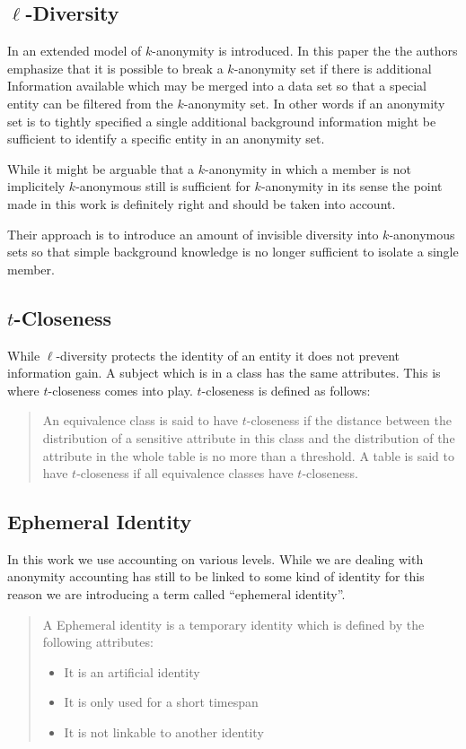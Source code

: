 \subsection{$\ell$-Diversity}
In \cite{machanavajjhala2007diversity} an extended model of $k$-anonymity is introduced. In this paper the the authors emphasize that it is possible to break a $k$-anonymity set if there is additional Information available which may be merged into a data set so that a special entity can be filtered from the $k$-anonymity set. In other words if an anonymity set is to tightly specified a single additional background information might be sufficient to identify a specific entity in an anonymity set.

While it might be arguable that a $k$-anonymity in which a member is not implicitely $k$-anonymous still is sufficient for $k$-anonymity in its sense the point made in this work is definitely right and should be taken into account.

Their approach is to introduce an amount of invisible diversity into $k$-anonymous sets so that simple background knowledge is no longer sufficient to isolate a single member.

\subsection{$t$-Closeness}
While $\ell$-diversity protects the identity of an entity it does not prevent information gain. A subject which is in a class has the same attributes. This is where $t$-closeness\cite{li2007t} comes into play. $t$-closeness is defined as follows:

\begin{quote}
	An equivalence class is said to have $t$-closeness if the distance between the distribution of a sensitive attribute in this class and the distribution of the attribute in the whole table is no more than a threshold. A table is said to have $t$-closeness if all equivalence classes have $t$-closeness.
\end{quote}

\subsection{Ephemeral Identity}
In this work we use accounting on various levels. While we are dealing with anonymity accounting has still to be linked to some kind of identity for this reason we are introducing a term called ``ephemeral identity''.

\begin{quote}
	A Ephemeral identity is a temporary identity which is defined by the following attributes:
	\begin{itemize}
		\item It is an artificial identity
		\item It is only used for a short timespan
		\item It is not linkable to another identity
	\end{itemize}
\end{quote}

